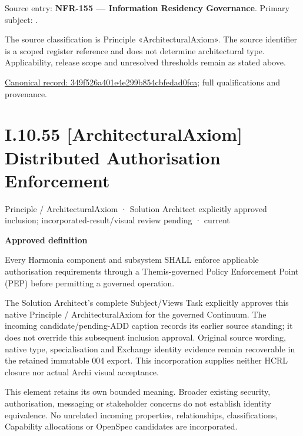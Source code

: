 Source entry: \textbf{NFR-155 — Information Residency Governance}. Primary subject: \texttt{}.



The source classification is Principle «ArchitecturalAxiom». The source identifier is a scoped register reference and does not determine architectural type. Applicability, release scope and unresolved thresholds remain as stated above.


{\footnotesize \href{../../../../../../../continuum/motivation/principle/architectural-axiom/349f526a401e4e299b854cbfedad0fca.md}{Canonical record: 349f526a401e4e299b854cbfedad0fca}; full qualifications and provenance.}\par
\section*{I.10.55 [ArchitecturalAxiom] Distributed Authorisation Enforcement}
\label{navigation:I.10.55}

\label{element:172720628fa540928e34b52562c7067f}
{\small Principle / ArchitecturalAxiom · Solution Architect explicitly approved inclusion; incorporated-result/visual review pending · current}\par

\par\medskip\textbf{Approved definition}\par


Every Harmonia component and subsystem SHALL enforce applicable authorisation requirements through a Themis-governed Policy Enforcement Point (PEP) before permitting a governed operation.



The Solution Architect's complete Subject/Views Task explicitly approves this
native Principle / ArchitecturalAxiom for the governed Continuum.
The incoming candidate/pending-ADD caption records its earlier source standing;
it does not override this subsequent inclusion approval. Original source wording,
native type, specialisation and Exchange identity evidence remain recoverable in
the retained immutable 004 export. This incorporation supplies neither HCRL closure
nor actual Archi visual acceptance.



This element retains its own bounded meaning. Broader existing security,
authorisation, messaging or stakeholder concerns do not establish identity
equivalence. No unrelated incoming properties, relationships, classifications,
Capability allocations or OpenSpec candidates are incorporated.


